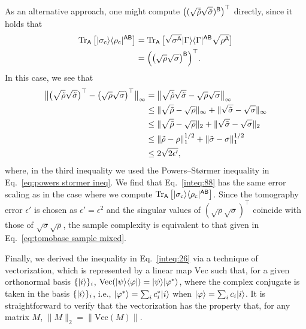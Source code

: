 As an alternative approach, one might compute $\big((\sqrt{\tilde{\rho}}\sqrt{\tilde{\sigma}})^{{\mathsf{B}}}\big)^\top$ directly, since it holds that
\begin{align}
    \operatorname{Tr}_{\mathsf{A}}\big[|\sigma_{\rm c}\rangle\langle\rho_{\rm c}|^{{\mathsf{A}}{\mathsf{B}}}\big] 
    &= \operatorname{Tr}_{\mathsf{A}}\big[\sqrt{\sigma^{\mathsf{A}}}|\Gamma\rangle\langle\Gamma|^{{\mathsf{A}}{\mathsf{B}}}\sqrt{\rho^{\mathsf{A}}}\big] \\
    &= \Big(\big(\sqrt{\rho}\sqrt{\sigma}\big)^{{\mathsf{B}}}\Big)^\top.
\end{align}
In this case, we see that
\begin{align}
    \big\|\big(\sqrt{\tilde{\rho}}\sqrt{\tilde{\sigma}}\big)^\top - \big(\sqrt{\rho}\sqrt{\sigma}\big)^\top\big\|_\infty
    &=\big\|\sqrt{\tilde{\rho}}\sqrt{\tilde{\sigma}} - \sqrt{\rho}\sqrt{\sigma}\big\|_\infty \\
    &\leq\|\sqrt{\tilde{\rho}} - \sqrt{\rho}\|_\infty 
    + \|\sqrt{\tilde{\sigma}} - \sqrt{\sigma}\|_\infty \\
    &\leq\|\sqrt{\tilde{\rho}} - \sqrt{\rho}\|_2 
    + \|\sqrt{\tilde{\sigma}} - \sqrt{\sigma}\|_2 \\
    &\leq\|\tilde{\rho} - \rho\|_1^{1/2} 
    + \|\tilde{\sigma} - \sigma\|_1^{1/2} \\
    \label{inteq:88}
    &\leq 2\sqrt{2\epsilon'},
\end{align}
where, in the third inequality we used the Powers--St\o rmer inequality in Eq.~\eqref{eq:powers stormer ineq}.
We find that Eq.~\eqref{inteq:88} has the same error scaling as in the case where we compute $\operatorname{Tr}_{\mathsf{A}}\big[|\sigma_{\rm c}\rangle\langle\rho_{\rm c}|^{{\mathsf{A}}{\mathsf{B}}}\big]$. 
Since the tomography error $\epsilon'$ is chosen as $\epsilon' = \epsilon^2$ and the singular values of $(\sqrt{\rho}\sqrt{\sigma})^\top$ coincide with those of $\sqrt{\sigma}\sqrt{\rho}$, the sample complexity is equivalent to that given in Eq.~\eqref{eq:tomobase sample mixed}.







Finally, we derived the inequality in Eq.~\eqref{inteq:26} via a technique of vectorization, which is represented by a linear map $\mathrm{Vec}$ such that, for a given orthonormal basis $\{|i\rangle\}_i$, $\mathrm{Vec}(|\psi\rangle\langle\varphi|) = |\psi\rangle|\varphi^*\rangle$, where the complex conjugate is taken in the basis $\{|i\rangle\}_i$, i.e., $|\varphi^*\rangle = \sum_ic_i^*|i\rangle$ when $|\varphi\rangle = \sum_i c_i|i\rangle$.
It is straightforward to verify that the vectorization has the property that, for any matrix $M$, $\|M\|_2 = \|\mathrm{Vec}(M)\|$.

